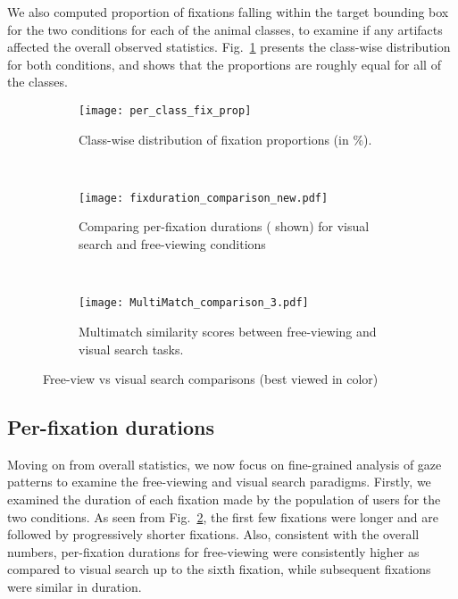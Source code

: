 \documentclass{article}
\begin{document}
We also computed proportion of fixations falling within the target bounding box for the two conditions for each of the animal classes, to examine if any artifacts affected the overall observed statistics. Fig.~\ref{cwfp} presents the class-wise distribution for both conditions, and shows that the proportions are roughly equal for all of the classes.   




\begin{figure*}[!ht]
    \centering
    \begin{subfigure}[t]{0.22\textwidth}
        \centering
        \texttt{[image: per\_class\_fix\_prop]}
        \caption{Class-wise distribution of fixation proportions (in \%).}\label{cwfp}
    \end{subfigure}~
    \begin{subfigure}[t]{0.37\textwidth}
        \centering
        \texttt{[image: fixduration\_comparison\_new.pdf]}
        \caption{Comparing per-fixation durations ( shown) for visual search and free-viewing conditions}\label{pfdc}
    \end{subfigure}
~
    \begin{subfigure}[t]{0.37\textwidth}
        \centering
        \texttt{[image: MultiMatch\_comparison\_3.pdf]}
        \caption{Multimatch similarity scores between free-viewing and visual search tasks.}\label{Mmatch}
    \end{subfigure}
		\caption{Free-view vs visual search comparisons (best viewed in color)}
  \end{figure*}

\subsection{Per-fixation durations}
Moving on from overall statistics, we now focus on fine-grained analysis of gaze patterns to examine the free-viewing and visual search paradigms. Firstly, we examined the duration of each fixation made by the population of users for the two conditions. As seen from Fig.~\ref{pfdc}, the first few fixations were longer and are followed by progressively shorter fixations. Also, consistent with the overall numbers, per-fixation durations for free-viewing were consistently higher as compared to visual search up to the sixth fixation, while subsequent fixations were similar in duration.
\end{document}
